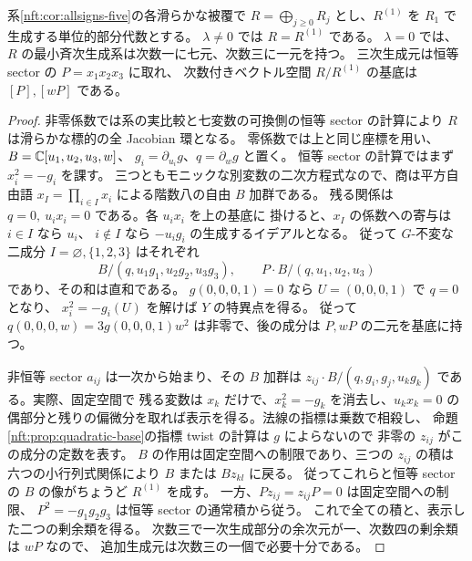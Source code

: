 \begin{proposition}[偶符号族の自然変換環の生成次数]\label{nft:prop:sign-generators}
系\ref{nft:cor:allsigns-five}の各滑らかな被覆で
$R=\bigoplus_{j\ge0}R_j$ とし、$R^{(1)}$ を $R_1$ で生成する単位的部分代数とする。
$\lambda\ne0$ では $R=R^{(1)}$ である。
$\lambda=0$ では、$R$ の最小斉次生成系は次数一に七元、次数三に一元を持つ。
三次生成元は恒等 sector の $P=x_1x_2x_3$ に取れ、
次数付きベクトル空間 $R/R^{(1)}$ の基底は $[P],[wP]$ である。
\end{proposition}
\begin{proof}
非零係数では系の実比較と七変数の可換側の恒等 sector の計算により
$R$ は滑らかな標的の全 Jacobian 環となる。
零係数では上と同じ座標を用い、$B=\mathbb C[u_1,u_2,u_3,w]$、
$g_i=\partial_{u_i}g$、$q=\partial_wg$ と置く。
恒等 sector の計算ではまず $x_i^2=-g_i$ を課す。
三つともモニックな別変数の二次方程式なので、商は平方自由語
$x_I=\prod_{i\in I}x_i$ による階数八の自由 $B$ 加群である。
残る関係は $q=0,\ u_ix_i=0$ である。各 $u_ix_i$ を上の基底に
掛けると、$x_I$ の係数への寄与は $i\in I$ なら $u_i$、
$i\notin I$ なら $-u_i g_i$ の生成するイデアルとなる。
従って $G$-不変な二成分 $I=\varnothing,\{1,2,3\}$ はそれぞれ
\[
 B/(q,u_1g_1,u_2g_2,u_3g_3),\qquad P\cdot B/(q,u_1,u_2,u_3)
\]
であり、その和は直和である。
$g(0,0,0,1)=0$ なら $U=(0,0,0,1)$ で $q=0$ となり、
$x_i^2=-g_i(U)$ を解けば $Y$ の特異点を得る。
従って $q(0,0,0,w)=3g(0,0,0,1)w^2$ は非零で、後の成分は
$P,wP$ の二元を基底に持つ。

非恒等 sector $a_{ij}$ は一次から始まり、その $B$ 加群は
$z_{ij}\cdot B/(q,g_i,g_j,u_k g_k)$ である。実際、固定空間で
残る変数は $x_k$ だけで、$x_k^2=-g_k$ を消去し、$u_k x_k=0$ の
偶部分と残りの偏微分を取れば表示を得る。法線の指標は乗数で相殺し、
命題\ref{nft:prop:quadratic-base}の指標 twist の計算は $g$ によらないので
非零の $z_{ij}$ がこの成分の定数を表す。
$B$ の作用は固定空間への制限であり、三つの $z_{ij}$ の積は
六つの小行列式関係により $B$ または $Bz_{kl}$ に戻る。
従ってこれらと恒等 sector の $B$ の像がちょうど $R^{(1)}$ を成す。
一方、$Pz_{ij}=z_{ij}P=0$ は固定空間への制限、
$P^2=-g_1g_2g_3$ は恒等 sector の通常積から従う。
これで全ての積と、表示した二つの剰余類を得る。
次数三で一次生成部分の余次元が一、次数四の剰余類は $wP$ なので、
追加生成元は次数三の一個で必要十分である。
\end{proof}

